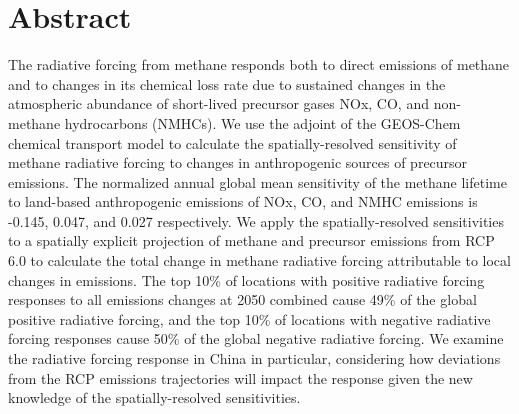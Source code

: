 \section*{Abstract}

The radiative forcing from methane responds both to direct emissions of methane and to changes in its chemical loss rate due to sustained changes in the atmospheric abundance of short-lived precursor gases NOx, CO, and non-methane hydrocarbons (NMHCs). We use the adjoint of the GEOS-Chem chemical transport model to calculate the spatially-resolved sensitivity of methane radiative forcing to changes in anthropogenic sources of precursor emissions. The normalized annual global mean sensitivity of the methane lifetime to land-based anthropogenic emissions of NOx, CO, and NMHC emissions is -0.145, 0.047, and 0.027 respectively. We apply the spatially-resolved sensitivities to a spatially explicit projection of methane and precursor emissions from RCP 6.0 to calculate the total change in methane radiative forcing attributable to local changes in emissions. The top 10\% of locations with positive radiative forcing responses to all emissions changes at 2050 combined cause 49\% of the global positive radiative forcing, and the top 10\% of locations with negative radiative forcing responses cause 50\% of the global negative radiative forcing. We examine the radiative forcing response in China in particular, considering how deviations from the RCP emissions trajectories will impact the response given the new knowledge of the spatially-resolved sensitivities.